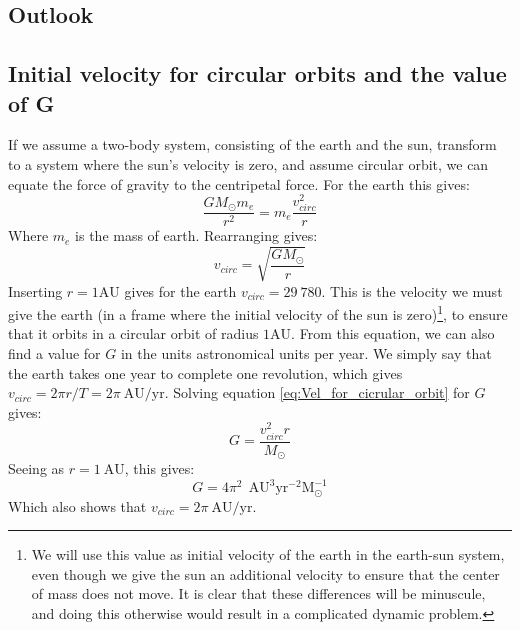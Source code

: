 \documentclass[a4paper, 10pt]{article}
\begin{document}
\subsection{Outlook}
\begin{appendices}
\section{Initial velocity for circular orbits and the value of G}\label{ap:Find_Circular_orbit}
If we assume a two-body system, consisting of the earth and the sun, transform to a system where the sun's velocity is zero, and assume circular orbit, we can equate the force of gravity to the centripetal force. For the earth this gives:
$$\frac{GM_{\odot}m_e}{r^2}=m_e\frac{v_{circ}^2}{r}$$
Where $m_e$ is the mass of earth. Rearranging gives:
\begin{equation}\label{eq:Vel_for_cicrular_orbit}
v_{circ}=\sqrt{\frac{GM_{\odot}}{r}}
\end{equation}
Inserting $r=1 \mathrm{AU}$ gives for the earth $v_{circ}=29\ 780$. This is the velocity we must give the earth (in a frame where the initial velocity of the sun is zero)\footnote{We will use this value as initial velocity of the earth in the earth-sun system, even though we give the sun an additional velocity to ensure that the center of mass does not move. It is clear that these differences will be minuscule, and doing this otherwise would result in a complicated dynamic problem.}, to ensure that it orbits in a circular orbit of radius $1 \mathrm{AU}$. 
\linebreak
From this equation, we can also find a value for $G$ in the units astronomical units per year. We simply say that the earth takes one year to complete one revolution, which gives $v_{circ}=2\pi r/T=2\pi \ \mathrm{AU/yr}$. Solving equation \ref{eq:Vel_for_cicrular_orbit} for $G$ gives:
$$G=\frac{v_{circ}^2 r}{M_{\odot}}$$
Seeing as  $r=1 \ \mathrm{AU}$, this gives:
$$G=4\pi^2\ \ \mathrm{AU^3}\mathrm{yr^{-2}M_{\odot}^{-1}}$$
Which also shows that $v_{circ}=2\pi \ \mathrm{AU/yr}$.

\end{appendices}
\end{document}
